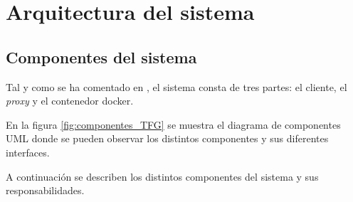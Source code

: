 \begin{table}[htb]
      {\traceabilityNFRE}
  \end{table}

\FloatBarrier

\section{Arquitectura del sistema}\label{sec:arquitectura-sistema}

\subsection{Componentes del sistema} \label{sec:componentes-sistema}

Tal y como se ha comentado en , el sistema consta de tres partes: el cliente, el \textit{\gls{proxy}} y el contenedor docker.

En la figura \ref{fig:componentes_TFG} se muestra el diagrama de componentes UML \cite{Cook2017} donde se pueden observar los distintos componentes y sus diferentes interfaces.


A continuación se describen los distintos componentes del sistema y sus responsabilidades.

